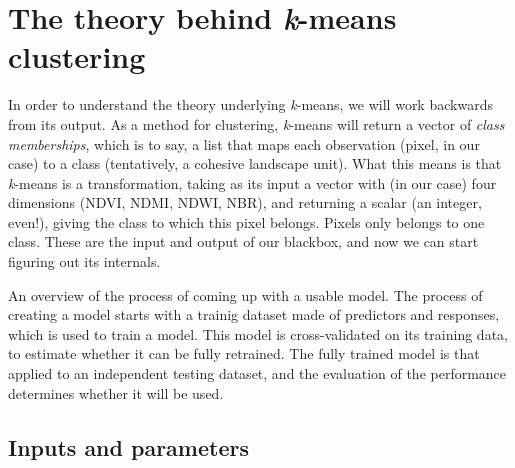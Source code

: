 \documentclass[
  letterpaper,
]{scrbook}
\begin{document}
\section{\texorpdfstring{The theory behind \emph{k}-means
clustering}{The theory behind k-means clustering}}\label{sec-kmeans-theory}

In order to understand the theory underlying \emph{k}-means, we will
work backwards from its output. As a method for clustering,
\emph{k}-means will return a vector of \emph{class memberships}, which
is to say, a list that maps each observation (pixel, in our case) to a
class (tentatively, a cohesive landscape unit). What this means is that
\emph{k}-means is a transformation, taking as its input a vector with
(in our case) four dimensions (NDVI, NDMI, NDWI, NBR), and returning a
scalar (an integer, even!), giving the class to which this pixel
belongs. Pixels only belongs to one class. These are the input and
output of our blackbox, and now we can start figuring out its internals.

\begin{flowchart}


\caption{\label{flw-kmeans}An overview of the process of coming up with
a usable model. The process of creating a model starts with a trainig
dataset made of predictors and responses, which is used to train a
model. This model is cross-validated on its training data, to estimate
whether it can be fully retrained. The fully trained model is that
applied to an independent testing dataset, and the evaluation of the
performance determines whether it will be used.}

\end{flowchart}%

\subsection{Inputs and parameters}\label{inputs-and-parameters}

\end{document}
